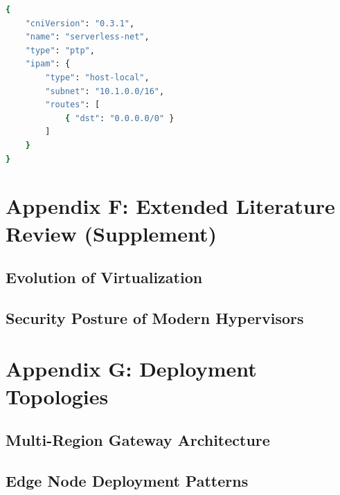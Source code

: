 \documentclass[12pt,a4paper]{report}
\begin{document}
\begin{lstlisting}[language=bash, caption={Optimized PTP CNI Configuration}]
{
    "cniVersion": "0.3.1",
    "name": "serverless-net",
    "type": "ptp",
    "ipam": {
        "type": "host-local",
        "subnet": "10.1.0.0/16",
        "routes": [
            { "dst": "0.0.0.0/0" }
        ]
    }
}
\end{lstlisting}



\chapter{Appendix F: Extended Literature Review (Supplement)}
\section{Evolution of Virtualization}
\lipsum[1-15]

\section{Security Posture of Modern Hypervisors}
\lipsum[16-30]

\chapter{Appendix G: Deployment Topologies}
\section{Multi-Region Gateway Architecture}
\lipsum[31-45]

\section{Edge Node Deployment Patterns}
\lipsum[46-60]
\end{document}
